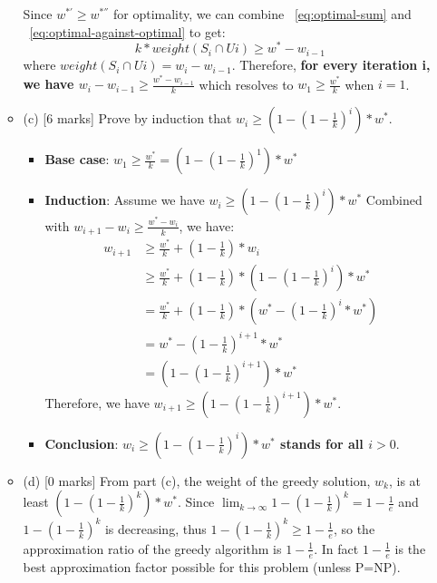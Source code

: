 \documentclass[12pt]{article}
\begin{document}
\begin{enumerate}
\begin{itemize}
Since $w^{*'} \geq w^{*''}$ for optimality, we can combine ~\ref{eq:optimal-sum} and ~\ref{eq:optimal-against-optimal} to get:
\begin{equation} \label{eq:optimal-against-optimal}
k * weight(S_{i} \cap U{i}) \geq w^{*} - w_{i-1}
\end{equation}
where $weight(S_{i} \cap U{i}) = w_{i} - w_{i-1}$. Therefore, \textbf{for every iteration i, we have $w_{i}-w_{i-1} \geq \frac{w^{*}-w_{i-1}}{k}$} which resolves to $w_{1} \geq \frac{w^{*}}{k}$ when $i = 1$.

\item{(c)} [6 marks]
Prove by induction that $w_{i} \geq (1-(1-\frac{1}{k})^{i}) * w^{*}$.

\begin{itemize}
\item \textbf{Base case}: $w_{1} \geq \frac{w^{*}}{k} = (1-(1-\frac{1}{k})^{1}) * w^{*}$
\item \textbf{Induction}: Assume we have $w_{i} \geq (1-(1-\frac{1}{k})^{i}) * w^{*}$
Combined with $w_{i+1}-w_{i} \geq \frac{w^{*}-w_{i}}{k}$, we have:
\begin{align*}
w_{i+1} &\geq \frac{w^{*}}{k} + (1 - \frac{1}{k}) * w_{i}
\\
&\geq \frac{w^{*}}{k} + (1 - \frac{1}{k}) * (1-(1-\frac{1}{k})^{i}) * w^{*}
\\
&= \frac{w^{*}}{k} + (1 - \frac{1}{k}) * (w^{*} - (1-\frac{1}{k})^{i} * w^{*})
\\
&= w^{*} - (1-\frac{1}{k})^{i+1} * w^{*}
\\
&= (1-(1-\frac{1}{k})^{i+1}) * w^{*}
\end{align*}
Therefore, we have \textbf{$w_{i+1} \geq (1-(1-\frac{1}{k})^{i+1}) * w^{*}$}.
\item \textbf{Conclusion}: \textbf{$w_{i} \geq (1-(1-\frac{1}{k})^{i}) * w^{*}$ stands for all $i > 0$}.
\end{itemize}

\item{(d)} [0 marks]
From part (c), the weight of the greedy solution, $w_{k}$, is at least $(1-(1-\frac{1}{k})^{k}) * w^{*}$. Since $\lim_{k \to \infty} 1-(1-\frac{1}{k})^{k} = 1 - \frac{1}{e}$ and $1-(1-\frac{1}{k})^{k}$ is decreasing, thus $1-(1-\frac{1}{k})^{k} \geq 1 - \frac{1}{e}$, so the approximation ratio of the greedy algorithm is $1 - \frac{1}{e}$. In fact $1 - \frac{1}{e}$ is the best approximation factor possible for this problem (unless P=NP).

\end{itemize}


\end{enumerate}
\end{document}
